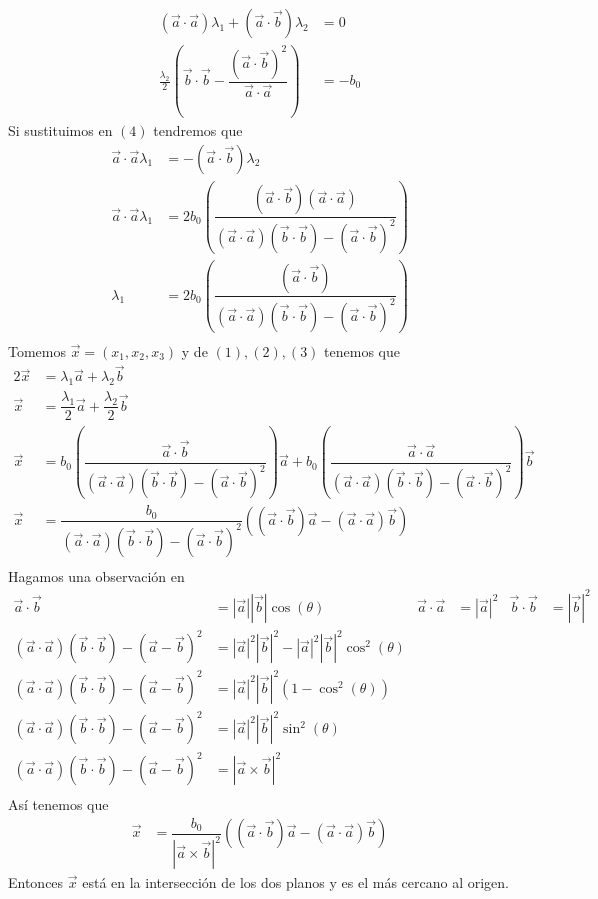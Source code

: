 \documentclass[letterpaper]{article}
\providecommand{\abs}[1]{\left|#1\right|}
\renewcommand{\l}{\lambda}
\renewcommand{\*}{\cdot}
\theoremstyle{definition}
\begin{document}
\begin{align*}
	(\vec{a} \* \vec{a}) \l_1 + (\vec{a} \* \vec{b}) \l_2 &= 0 \label{eq:penUltima}\tag{4}\\
	\frac{\l_2}{2}\left( \vec{b}\* \vec{b} - \dfrac{(\vec{a} \* \vec{b})^2}{\vec{a} \* \vec{a}} \right) &= -b_0 \label{eq:Ultima}\tag{5}
\end{align*}
Si sustituimos en $ (4) $ tendremos que
\begin{align*}
	\vec{a} \* \vec{a} \l_1 &= -(\vec{a} \* \vec{b})\l_2 \\
	\vec{a} \* \vec{a} \l_1 &= 2b_0 \left( \dfrac{(\vec{a} \* \vec{b})(\vec{a} \* \vec{a}) }{(\vec{a} \* \vec{a})(\vec{b} \* \vec{b}) - (\vec{a} \* \vec{b})^2} \right)\\
	\l_1 &= 2b_0 \left( \dfrac{(\vec{a} \* \vec{b}) }{(\vec{a} \* \vec{a})(\vec{b} \* \vec{b}) - (\vec{a} \* \vec{b})^2} \right)\\
\end{align*}
Tomemos $ \vec{x} = (x_1, x_2, x_3) $ y de $ (1),(2),(3) $ tenemos que
\begin{align*}
	2\vec{x} &= \l_1 \vec{a} + \l_2 \vec{b}\\
	\vec{x} &= \dfrac{\l_1}{2} \vec{a} + \dfrac{\l_2}{2} \vec{b}\\
	\vec{x} &= b_0\left( \dfrac{\vec{a} \* \vec{b}}{(\vec{a} \* \vec{a})(\vec{b} \* \vec{b}) - (\vec{a} \* \vec{b})^2} \right)\vec{a} + b_0\left( \dfrac{\vec{a} \* \vec{a}}{(\vec{a} \* \vec{a})(\vec{b} \* \vec{b}) - (\vec{a} \* \vec{b})^2} \right) \vec{b}\\
	\vec{x} &= \dfrac{b_0}{(\vec{a} \* \vec{a})(\vec{b} \* \vec{b}) - (\vec{a} \* \vec{b})^2} \left( (\vec{a} \* \vec{b})\vec{a} - (\vec{a} \* \vec{a})\vec{b} \right)\\
\end{align*}
Hagamos una observación en
\begin{align*}
	\vec{a} \* \vec{b} &= \abs{\vec{a}}\abs{\vec{b}}\cos(\theta) & \vec{a} \* \vec{a} &= \abs{\vec{a}}^2 & \vec{b} \* \vec{b} &= \abs{\vec{b}}^2\\
	(\vec{a} \* \vec{a})( \vec{b} \* \vec{b}) - (\vec{a} - \vec{b})^2 &= \abs{\vec{a}}^2 \abs{\vec{b}}^2 - \abs{\vec{a}}^2 \abs{\vec{b}}^2\cos^2(\theta)\\
	(\vec{a} \* \vec{a})( \vec{b} \* \vec{b}) - (\vec{a} - \vec{b})^2 &= \abs{\vec{a}}^2 \abs{\vec{b}}^2 (1 - \cos^2(\theta))\\ 
	(\vec{a} \* \vec{a})( \vec{b} \* \vec{b}) - (\vec{a} - \vec{b})^2 &= \abs{\vec{a}}^2 \abs{\vec{b}}^2 \sin^2(\theta)\\ 
	(\vec{a} \* \vec{a})( \vec{b} \* \vec{b}) - (\vec{a} - \vec{b})^2 &= \abs{\vec{a} \times \vec{b}}^2\\ 
\end{align*}
Así tenemos que 
\begin{align*}
	\vec{x} &= \dfrac{b_0}{\abs{\vec{a} \times \vec{b}}^2}\left( (\vec{a}\* \vec{b})\vec{a} - (\vec{a} \* \vec{a})\vec{b} \right)
\end{align*}
Entonces $ \vec{x} $ está en la intersección de los dos planos y es el más cercano al origen.
\end{document}
